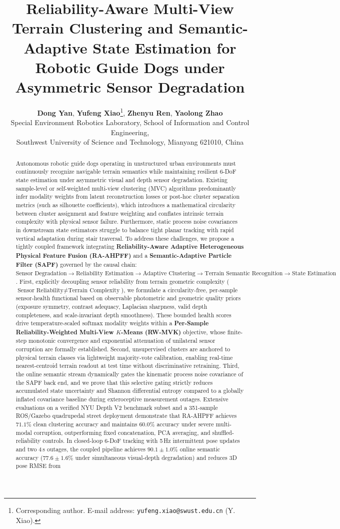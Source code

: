 \documentclass[11pt, a4paper]{article}
\title{\textbf{Reliability-Aware Multi-View Terrain Clustering and Semantic-Adaptive State Estimation for Robotic Guide Dogs under Asymmetric Sensor Degradation}}
\author{
    \textbf{Dong Yan}, \textbf{Yufeng Xiao}\thanks{Corresponding author. E-mail address: \texttt{yufeng.xiao@swust.edu.cn} (Y. Xiao).}\;,\; \textbf{Zhenyu Ren}, \textbf{Yaolong Zhao} \\[4pt]
    \small Special Environment Robotics Laboratory, School of Information and Control Engineering, \\
    \small Southwest University of Science and Technology, Mianyang 621010, China
}
\date{}
\begin{document}
\maketitle

\begin{abstract}
\noindent
Autonomous robotic guide dogs operating in unstructured urban environments must continuously recognize navigable terrain semantics while maintaining resilient 6-DoF state estimation under asymmetric visual and depth sensor degradation. Existing sample-level or self-weighted multi-view clustering (MVC) algorithms predominantly infer modality weights from latent reconstruction losses or post-hoc cluster separation metrics (such as silhouette coefficients), which introduces a mathematical circularity between cluster assignment and feature weighting and conflates intrinsic terrain complexity with physical sensor failure. Furthermore, static process noise covariances in downstream state estimators struggle to balance tight planar tracking with rapid vertical adaptation during stair traversal. To address these challenges, we propose a tightly coupled framework integrating \textbf{Reliability-Aware Adaptive Heterogeneous Physical Feature Fusion (RA-AHPFF)} and a \textbf{Semantic-Adaptive Particle Filter (SAPF)} governed by the causal chain: $\text{Sensor Degradation} \to \text{Reliability Estimation} \to \text{Adaptive Clustering} \to \text{Terrain Semantic Recognition} \to \text{State Estimation}$. First, explicitly decoupling sensor reliability from terrain geometric complexity ($\text{Sensor Reliability} \neq \text{Terrain Complexity}$), we formulate a circularity-free, per-sample sensor-health functional based on observable photometric and geometric quality priors (exposure symmetry, contrast adequacy, Laplacian sharpness, valid depth completeness, and scale-invariant depth smoothness). These bounded health scores drive temperature-scaled softmax modality weights within a \textbf{Per-Sample Reliability-Weighted Multi-View $K$-Means (RW-MVK)} objective, whose finite-step monotonic convergence and exponential attenuation of unilateral sensor corruption are formally established. Second, unsupervised clusters are anchored to physical terrain classes via lightweight majority-vote calibration, enabling real-time nearest-centroid terrain readout at test time without discriminative retraining. Third, the online semantic stream dynamically gates the kinematic process noise covariance of the SAPF back end, and we prove that this selective gating strictly reduces accumulated state uncertainty and Shannon differential entropy compared to a globally inflated covariance baseline during exteroceptive measurement outages. Extensive evaluations on a verified NYU Depth V2 benchmark subset and a 351-sample ROS/Gazebo quadrupedal street deployment demonstrate that RA-AHPFF achieves $71.1\%$ clean clustering accuracy and maintains $60.0\%$ accuracy under severe multi-modal corruption, outperforming fixed concatenation, PCA averaging, and shuffled-reliability controls. In closed-loop 6-DoF tracking with 5\,Hz intermittent pose updates and two 4\,s outages, the coupled pipeline achieves $90.1\pm1.0\%$ online semantic accuracy ($77.6\pm1.6\%$ under simultaneous visual-depth degradation) and reduces 3D pose RMSE from 
\end{abstract}
\end{document}
